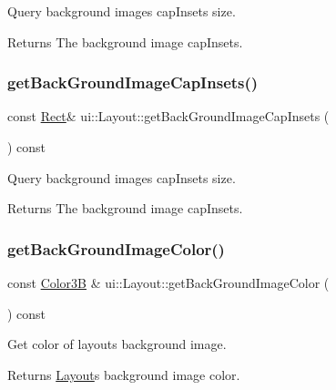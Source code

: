 Query background image\textquotesingle{}s cap\+Insets size. \begin{DoxyReturn}{Returns}
The background image cap\+Insets. 
\end{DoxyReturn}
\mbox{\label{classui_1_1Layout_a4ebdbc27ee0e1c3de344c80132297425}} 
\subsubsection{\texorpdfstring{get\+Back\+Ground\+Image\+Cap\+Insets()}{getBackGroundImageCapInsets()}\hspace{0.1cm}{\footnotesize\ttfamily [2/2]}}
{\footnotesize\ttfamily const \hyperlink{classRect}{Rect}\& ui\+::\+Layout\+::get\+Back\+Ground\+Image\+Cap\+Insets (\begin{DoxyParamCaption}{ }\end{DoxyParamCaption}) const}

Query background image\textquotesingle{}s cap\+Insets size. \begin{DoxyReturn}{Returns}
The background image cap\+Insets. 
\end{DoxyReturn}
\mbox{\label{classui_1_1Layout_ac962ad946d770befb7bee1cc2c977c22}} 
\subsubsection{\texorpdfstring{get\+Back\+Ground\+Image\+Color()}{getBackGroundImageColor()}\hspace{0.1cm}{\footnotesize\ttfamily [1/2]}}
{\footnotesize\ttfamily const \hyperlink{structColor3B}{Color3B} \& ui\+::\+Layout\+::get\+Back\+Ground\+Image\+Color (\begin{DoxyParamCaption}{ }\end{DoxyParamCaption}) const}

Get color of layout\textquotesingle{}s background image. \begin{DoxyReturn}{Returns}
\hyperlink{classui_1_1Layout}{Layout}\textquotesingle{}s background image color. 
\end{DoxyReturn}
\mbox{\label{classui_1_1Layout_a8f96b431d9a430fcf3692cf927c0e4c6}} 
